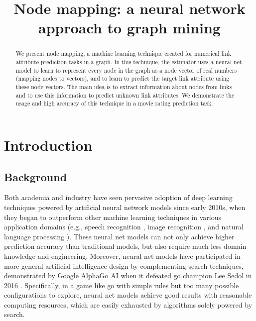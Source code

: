\documentclass{article}
\begin{document}
\lstset{language=python, tabsize=4}
\title{Node mapping: a neural network approach to graph mining}
\maketitle

\begin{abstract}
	We present node mapping, a machine learning technique created for numerical 
	link attribute prediction tasks in a graph.
	In this technique, the estimator uses a neural net model to learn to 
	represent every node in the graph as a node vector of real numbers (mapping 
	nodes to vectors), and to learn to predict the target link attribute using 
	these node vectors.
	The main idea is to extract information about nodes from links and to use 
	this information to predict unknown link attributes.
	We demonstrate the usage and high accuracy of this technique in a movie 
	rating prediction task.
\end{abstract}

\section{Introduction}

\subsection{Background}
Both academia and industry have seen pervasive adoption of deep learning 
techniques powered by artificial neural network models since early 2010s,
when they began to outperform other machine learning techniques in various 
application domains (e.g., speech recognition \cite{hannun2014deep}, image 
recognition \cite{simonyan2014very}, and natural language processing 
\cite{yao2013recurrent}).
These neural net models can not only achieve higher prediction accuracy than 
traditional models,
but also require much less domain knowledge and engineering.
Moreover, neural net models have participated in more general artificial 
intelligence design by complementing search techniques, 
demonstrated by Google AlphaGo AI when it defeated go champion Lee Sedol in 
2016 \cite{silver2016mastering}.
Specifically, in a game like go with simple rules but too many possible 
configurations to explore,
neural net models achieve good results with reasonable computing resources, 
which are easily exhausted by algorithms solely powered by search.
\end{document}

